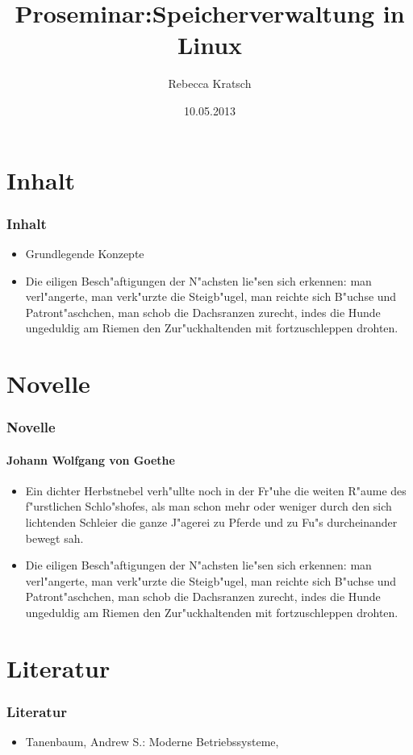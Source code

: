 \documentclass[ddcfooter]{tudbeamer}
\begin{document}
\title[Speicherverwaltung in Linux]{Proseminar:\vfill Speicherverwaltung in Linux}
\author{Rebecca Kratsch}

\date{10.05.2013}

\maketitle

\section{Inhalt}
\begin{frame}
    \frametitle{Inhalt}
       \begin{itemize}
        \item Grundlegende Konzepte
        \item Die eiligen Besch"aftigungen der N"achsten lie"sen sich erkennen:
              man verl"angerte, man verk"urzte die Steigb"ugel, man reichte sich B"uchse
              und Patront"aschchen, man schob die Dachsranzen zurecht, indes die Hunde
              ungeduldig am Riemen den Zur"uckhaltenden mit fortzuschleppen drohten.
    \end{itemize}
\end{frame}



\section{Novelle}
\begin{frame}
    \frametitle{Novelle}
    \framesubtitle{Johann Wolfgang von Goethe}
    \begin{itemize}
        \item Ein dichter Herbstnebel verh"ullte noch in der Fr"uhe die weiten R"aume des
              f"urstlichen Schlo"shofes, als man schon mehr oder weniger durch den sich
              lichtenden Schleier die ganze J"agerei zu Pferde und zu Fu"s durcheinander
              bewegt sah. 
        \item Die eiligen Besch"aftigungen der N"achsten lie"sen sich erkennen:
              man verl"angerte, man verk"urzte die Steigb"ugel, man reichte sich B"uchse
              und Patront"aschchen, man schob die Dachsranzen zurecht, indes die Hunde
              ungeduldig am Riemen den Zur"uckhaltenden mit fortzuschleppen drohten.
    \end{itemize}
\end{frame}

\section{Literatur}
\begin{frame}
    \frametitle*{Literatur}
    \begin{itemize}
        \item Tanenbaum, Andrew S.: Moderne Betriebssysteme,
    \end{itemize}
\end{frame}
\end{document}

